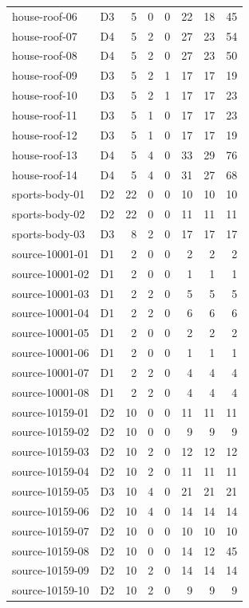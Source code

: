 \begin{longtable}{llrrrrrr}
house-roof-06 & D3 & 5 & 0 & 0 & 22 & 18 & 45\\
house-roof-07 & D4 & 5 & 2 & 0 & 27 & 23 & 54\\
house-roof-08 & D4 & 5 & 2 & 0 & 27 & 23 & 50\\
house-roof-09 & D3 & 5 & 2 & 1 & 17 & 17 & 19\\
house-roof-10 & D3 & 5 & 2 & 1 & 17 & 17 & 23\\
house-roof-11 & D3 & 5 & 1 & 0 & 17 & 17 & 23\\
house-roof-12 & D3 & 5 & 1 & 0 & 17 & 17 & 19\\
house-roof-13 & D4 & 5 & 4 & 0 & 33 & 29 & 76\\
house-roof-14 & D4 & 5 & 4 & 0 & 31 & 27 & 68\\
sports-body-01 & D2 & 22 & 0 & 0 & 10 & 10 & 10\\
sports-body-02 & D2 & 22 & 0 & 0 & 11 & 11 & 11\\
sports-body-03 & D3 & 8 & 2 & 0 & 17 & 17 & 17\\
source-10001-01 & D1 & 2 & 0 & 0 & 2 & 2 & 2\\
source-10001-02 & D1 & 2 & 0 & 0 & 1 & 1 & 1\\
source-10001-03 & D1 & 2 & 2 & 0 & 5 & 5 & 5\\
source-10001-04 & D1 & 2 & 2 & 0 & 6 & 6 & 6\\
source-10001-05 & D1 & 2 & 0 & 0 & 2 & 2 & 2\\
source-10001-06 & D1 & 2 & 0 & 0 & 1 & 1 & 1\\
source-10001-07 & D1 & 2 & 2 & 0 & 4 & 4 & 4\\
source-10001-08 & D1 & 2 & 2 & 0 & 4 & 4 & 4\\
source-10159-01 & D2 & 10 & 0 & 0 & 11 & 11 & 11\\
source-10159-02 & D2 & 10 & 0 & 0 & 9 & 9 & 9\\
source-10159-03 & D2 & 10 & 2 & 0 & 12 & 12 & 12\\
source-10159-04 & D2 & 10 & 2 & 0 & 11 & 11 & 11\\
source-10159-05 & D3 & 10 & 4 & 0 & 21 & 21 & 21\\
source-10159-06 & D2 & 10 & 4 & 0 & 14 & 14 & 14\\
source-10159-07 & D2 & 10 & 0 & 0 & 10 & 10 & 10\\
source-10159-08 & D2 & 10 & 0 & 0 & 14 & 12 & 45\\
source-10159-09 & D2 & 10 & 2 & 0 & 14 & 14 & 14\\
source-10159-10 & D2 & 10 & 2 & 0 & 9 & 9 & 9\\

\end{longtable}
